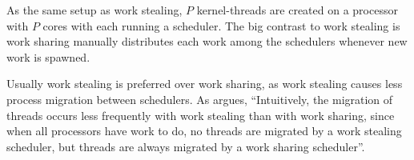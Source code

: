As the same setup as work stealing, $P$ kernel\hyp{}threads are created on a processor with $P$ cores with each running a scheduler. The big contrast to work stealing is work sharing manually distributes each work among the schedulers whenever new work is spawned. 

Usually work stealing is preferred over work sharing, as work stealing causes less process migration between schedulers. As \citet[page 721]{blumofe1999scheduling} argues, ``Intuitively, the migration of threads occurs less frequently with work stealing than with work sharing, since when all processors have work to do, no threads are migrated by a work stealing scheduler, but threads are always migrated by a work sharing scheduler''.

